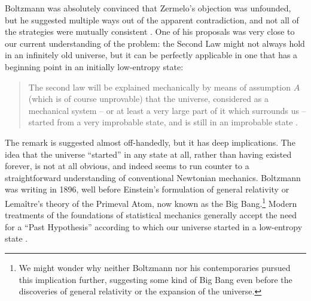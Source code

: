 \documentclass[12pt,letterpaper]{article}
\begin{document}
Boltzmann was absolutely convinced that Zermelo's objection was unfounded, but he suggested multiple ways out of the apparent contradiction, and not all of the strategies were mutually consistent \cite{boltzmannvzermelo1,boltzmannvzermelo2}.
One of his proposals was very close to our current understanding of the problem: the Second Law might not always hold in an infinitely old universe, but it can be perfectly applicable in one that has a beginning point in an initially low-entropy state:
\begin{quote}
The second law will be explained
mechanically by means of assumption $A$ (which is of course unprovable) that the universe,
considered as a mechanical system -- or at least a very large part of it which surrounds
us -- started from a very improbable state, and is still in an improbable state \cite{boltzmannvzermelo2}.
\end{quote}
The remark is suggested almost off-handedly, but it has deep implications.
The idea that the universe ``started'' in any state at all, rather than having existed forever, is not at all obvious, and indeed seems to run counter to a straightforward understanding of conventional Newtonian mechanics.
Boltzmann was writing in 1896, well before Einstein's formulation of general relativity or Lema\^itre's theory of the Primeval Atom, now known as the Big Bang.\footnote{We might wonder why neither Boltzmann nor his contemporaries pursued this implication further, suggesting some kind of Big Bang even before the discoveries of general relativity or the expansion of the universe.}
Modern treatments of the foundations of statistical mechanics generally accept the need for a ``Past Hypothesis'' according to which our universe started in a low-entropy state \cite{albert,Carroll:2010zz}.
\end{document}
